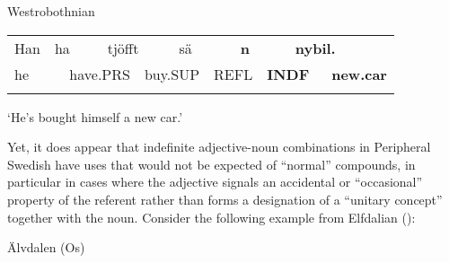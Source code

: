 \begin{listWWNumileveli}
\item 

\begin{styleExample}
\label{bkm:Ref154565993}Westrobothnian

\end{styleExample}

\end{listWWNumileveli}

\begin{tabular}{llllllllllll}
\lsptoprule
Han & \multicolumn{2}{l}{ha

} & \multicolumn{2}{l}{tjöfft

} & \multicolumn{2}{l}{sä

} & \multicolumn{2}{l}{{\bfseries n}

} & \multicolumn{2}{l}{{\bfseries nybil.}

} & \\
\multicolumn{2}{l}{he

} & \multicolumn{2}{l}{have.PRS

} & \multicolumn{2}{l}{buy.SUP

} & \multicolumn{2}{l}{REFL

} & \multicolumn{2}{l}{{\bfseries INDF}

} & \multicolumn{2}{l}{{\bfseries new.car}

}\\
\lspbottomrule
\end{tabular}

\begin{styleTranslation}
‘He’s bought himself a new car.’

\end{styleTranslation}

\begin{styleBodyTextFirst}
Yet, it does appear that indefinite adjective-noun combinations in Peripheral Swedish have uses that would not be expected of “normal” compounds, in particular in cases where the adjective signals an accidental or “occasional” property of the referent rather than forms a designation of a “unitary concept” together with the noun. Consider the following example from Elfdalian (\citet[142]{Levander1909}):

\end{styleBodyTextFirst}

\begin{listWWNumileveli}
\item 

\begin{styleExample}
Älvdalen (Os)

\end{styleExample}

\end{listWWNumileveli}

